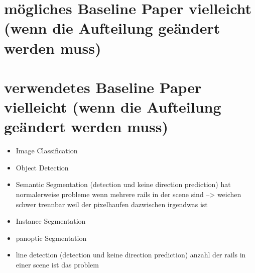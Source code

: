 
\clearpage




\clearpage                                                       %



\section{mögliches Baseline Paper vielleicht (wenn die Aufteilung geändert werden muss)}

\section{verwendetes Baseline Paper vielleicht (wenn die Aufteilung geändert werden muss)}

\begin{itemize}
    \item Image Classification
    \item Object Detection
    \item Semantic Segmentation (detection und keine direction prediction) hat normalerweise probleme wenn mehrere rails in der scene sind --> weichen schwer trennbar weil der pixelhaufen dazwischen irgendwas ist
    \item Instance Segmentation
    \item panoptic Segmentation
    \item line detection (detection und keine direction prediction) anzahl der rails in einer scene ist das problem
\end{itemize}